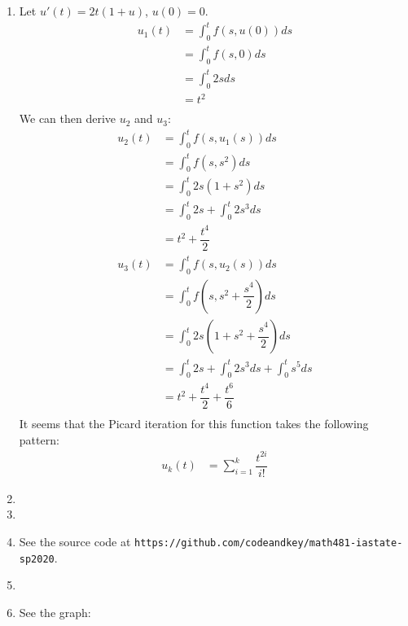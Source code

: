 \documentclass{article}
\begin{document}
\begin{enumerate}
    \item
        Let $u'(t) = 2t(1+u)$, $u(0)=0$. \\
        \begin{equation*}
            \begin{split}
                u_1(t) & = \int_{0}^{t} f(s, u(0))ds \\
                    & = \int_{0}^{t} f(s, 0)ds \\
                    & = \int_{0}^{t} 2sds \\
                    & = t^2 \\
            \end{split}
        \end{equation*}
        We can then derive $u_2$ and $u_3$:
        \begin{equation*}
            \begin{split}
                u_2(t) & = \int_{0}^{t} f(s, u_1(s))ds \\
                    & = \int_{0}^{t} f(s, s^2)ds \\
                    & = \int_{0}^{t} 2s(1+s^2)ds \\
                    & = \int_{0}^{t} 2s + \int_{0}^{t} 2s^3ds \\
                    & = t^2 + \dfrac{t^4}{2} \\
                u_3(t) & = \int_{0}^{t} f(s, u_2(s))ds \\
                    & = \int_{0}^{t} f(s, s^2 + \dfrac{s^4}{2})ds \\
                    & = \int_{0}^{t} 2s(1+s^2+\dfrac{s^4}{2})ds \\
                    & = \int_{0}^{t} 2s + \int_{0}^{t} 2s^3ds + \int_{0}^{t} s^5ds \\
                    & = t^2 + \dfrac{t^4}{2} + \dfrac{t^6}{6} \\
            \end{split}
        \end{equation*}
        It seems that the Picard iteration for this function takes the following pattern: \\
        \begin{equation*}
            \begin{split}
                u_k(t) & = \sum_{i=1}^{k} \dfrac{t^{2i}}{i!}
            \end{split}
        \end{equation*}
    \item
    \item
    \item
        See the source code at \texttt{https://github.com/codeandkey/math481-iastate-sp2020}. \\
    \item
    \item
        See the graph: \\
\end{enumerate}
\end{document}
